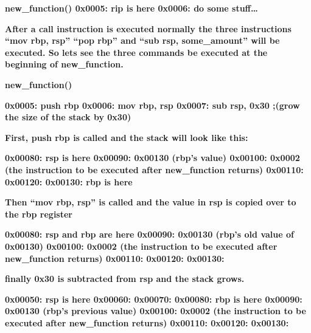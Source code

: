 \documentclass[letterpaper]{article}
\begin{document}
\textbf{new\_function()\newline
0x0005: rip is here\newline
0x0006: do some stuff{\dots}}

\textbf{After a call instruction is executed normally the three instructions ``mov rbp, rsp'' ``pop rbp'' and ``sub rsp,
some\_amount'' will be executed. So lets see the three commands be executed at the beginning of new\_function.}

\textbf{new\_function()}

\textbf{0x0005: push rbp\newline
0x0006: mov rbp, rsp\newline
0x0007: sub rsp, 0x30 ;(grow the size of the stack by 0x30)}

\textbf{First, push rbp is called and the stack will look like this:}

\textbf{0x00080: rsp is here\newline
0x00090: 0x00130 (rbp's value)\newline
0x00100: 0x0002 (the instruction to be executed after new\_function returns)\newline
0x00110:\newline
0x00120:\newline
0x00130: rbp is here}

\textbf{Then ``mov rbp, rsp'' is called and the value in rsp is copied over to the rbp register}

\textbf{0x00080: rsp and rbp are here\newline
0x00090: 0x00130 (rbp's old value of 0x00130)\newline
0x00100: 0x0002 (the instruction to be executed after new\_function returns)\newline
0x00110:\newline
0x00120:\newline
0x00130:}

\textbf{finally 0x30 is subtracted from rsp and the stack grows.}

\textbf{0x00050: rsp is here\newline
0x00060:\newline
0x00070:\newline
0x00080: rbp is here\newline
0x00090: 0x00130 (rbp's previous value)\newline
0x00100: 0x0002 (the instruction to be executed after new\_function returns)\newline
0x00110:\newline
0x00120:\newline
0x00130:}
\end{document}
